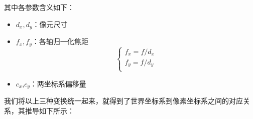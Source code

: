 \documentclass{article}
\begin{document}
\begin{itemize}
其中各参数含义如下：
\begin{itemize}
	\item $d_x,d_y$：像元尺寸
	\item $f_x,f_y$：各轴归一化焦距
		$$\begin{cases}
		f_x={{f}\big/{d_x}}\\
		f_y={{f}\big/{d_y}}\\
	\end{cases}$$
	\item $c_x$,$c_y$：两坐标系偏移量
\end{itemize}
\end{itemize}

我们将以上三种变换统一起来，就得到了世界坐标系到像素坐标系之间的对应关系，其推导如下所示：
\begin{tcolorbox}[colback=JungleGreen!10!Cerulean!15,colframe=CornflowerBlue!60!Black]
	

\end{tcolorbox}
\end{document}
